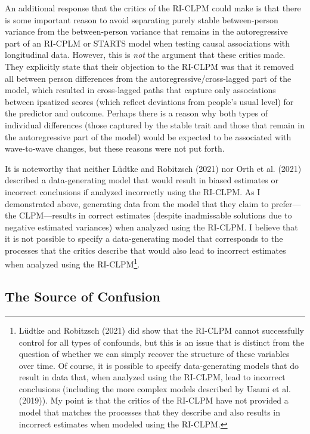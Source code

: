 \documentclass[
  english,
  man,floatsintext]{apa6}
\begin{document}
An additional response that the critics of the RI-CLPM could make is that there is some important reason to avoid separating purely stable between-person variance from the between-person variance that remains in the autoregressive part of an RI-CPLM or STARTS model when testing causal associations with longitudinal data. However, this is \emph{not} the argument that these critics made. They explicitly state that their objection to the RI-CLPM was that it removed all between person differences from the autoregressive/cross-lagged part of the model, which resulted in cross-lagged paths that capture only associations between ipsatized scores (which reflect deviations from people's usual level) for the predictor and outcome. Perhaps there is a reason why both types of individual differences (those captured by the stable trait and those that remain in the autoregressive part of the model) would be expected to be associated with wave-to-wave changes, but these reasons were not put forth.

It is noteworthy that neither Lüdtke and Robitzsch (2021) nor Orth et al. (2021) described a data-generating model that would result in biased estimates or incorrect conclusions if analyzed incorrectly using the RI-CLPM. As I demonstrated above, generating data from the model that they claim to prefer---the CLPM---results in correct estimates (despite inadmissable solutions due to negative estimated variances) when analyzed using the RI-CLPM. I believe that it is not possible to specify a data-generating model that corresponds to the processes that the critics describe that would also lead to incorrect estimates when analyzed using the RI-CLPM\footnote{Lüdtke and Robitzsch (2021) did show that the RI-CLPM cannot successfully control for all types of confounds, but this is an issue that is distinct from the question of whether we can simply recover the structure of these variables over time. Of course, it is possible to specify data-generating models that do result in data that, when analyzed using the RI-CLPM, lead to incorrect conclusions (including the more complex models described by Usami et al. (2019)). My point is that the critics of the RI-CLPM have not provided a model that matches the processes that they describe and also results in incorrect estimates when modeled using the RI-CLPM.}.

\hypertarget{the-source-of-confusion}{%
\subsection{The Source of Confusion}\label{the-source-of-confusion}}
\end{document}
